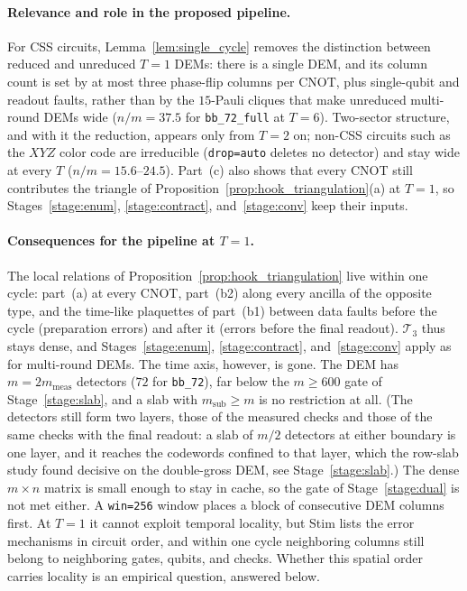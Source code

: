 \documentclass[12pt]{article}
\theoremstyle{definition}
\newcommand{\Tc}{\mathcal{T}_3}
\newcommand{\ttt}[1]{\texttt{#1}}
\begin{document}
\paragraph{Relevance and role in the proposed pipeline.}
For CSS circuits, Lemma~\ref{lem:single_cycle} removes the distinction between reduced and unreduced $T = 1$ DEMs:
there is a single DEM, and its column count is set by at most three phase-flip columns per CNOT, plus single-qubit
and readout faults, rather than by the $15$-Pauli cliques that make unreduced multi-round DEMs wide ($n/m = 37.5$ for
\ttt{bb\_72\_full} at $T = 6$). Two-sector structure, and with it the reduction, appears only from $T = 2$ on; non-CSS
circuits such as the $XYZ$ color code are irreducible (\ttt{drop=auto} deletes no detector) and stay wide at every
$T$ ($n/m = 15.6$--$24.5$). Part~(c) also shows that every CNOT still contributes the triangle of
Proposition~\ref{prop:hook_triangulation}(a) at $T = 1$, so Stages~\ref{stage:enum}, \ref{stage:contract},
and~\ref{stage:conv} keep their inputs.

\paragraph{Consequences for the pipeline at $T = 1$.}
The local relations of Proposition~\ref{prop:hook_triangulation} live within one cycle: part~(a) at every CNOT,
part~(b2) along every ancilla of the opposite type, and the time-like plaquettes of part~(b1) between data faults
before the cycle (preparation errors) and after it (errors before the final readout). $\Tc$ thus stays dense, and
Stages~\ref{stage:enum}, \ref{stage:contract}, and~\ref{stage:conv} apply as for multi-round DEMs. The time axis,
however, is gone. The DEM has $m = 2 m_{\mathrm{meas}}$ detectors ($72$ for \ttt{bb\_72}), far below the $m \ge 600$
gate of Stage~\ref{stage:slab}, and a slab with $m_{\mathrm{sub}} \ge m$ is no restriction at all. (The detectors
still form two layers, those of the measured checks and those of the same checks with the final readout: a slab of
$m/2$ detectors at either boundary is one layer, and it reaches the codewords confined to that layer, which the
row-slab study found decisive on the double-gross DEM, see Stage~\ref{stage:slab}.) The dense $m \times n$ matrix is
small enough to stay in cache, so the gate of Stage~\ref{stage:dual} is not met either. A \ttt{win=256} window places a
block of consecutive DEM columns first. At $T = 1$ it cannot exploit temporal locality, but Stim lists the error
mechanisms in circuit order, and within one cycle neighboring columns still belong to neighboring gates, qubits, and
checks. Whether this spatial order carries locality is an empirical question, answered below.
\end{document}
